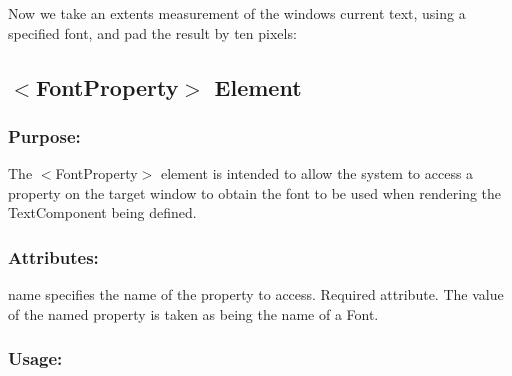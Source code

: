 Now we take an extents measurement of the windows current text, using a specified font, and pad the result by ten pixels\+: 
\begin{DoxyCode}{0}
\end{DoxyCode}
\hypertarget{fal_element_ref_fal_elem_ref_sec_13}{}\subsection{$<$\+Font\+Property$>$ Element}\label{fal_element_ref_fal_elem_ref_sec_13}
\hypertarget{fal_element_ref_fal_elem_ref_sec_13_1}{}\subsubsection{Purpose\+:}\label{fal_element_ref_fal_elem_ref_sec_13_1}
The {\ttfamily $<$Font\+Property$>$} element is intended to allow the system to access a property on the target window to obtain the font to be used when rendering the Text\+Component being defined.\hypertarget{fal_element_ref_fal_elem_ref_sec_13_2}{}\subsubsection{Attributes\+:}\label{fal_element_ref_fal_elem_ref_sec_13_2}
\begin{DoxyItemize}
\item {\ttfamily name} specifies the name of the property to access. Required attribute. The value of the named property is taken as being the name of a Font.\end{DoxyItemize}
\hypertarget{fal_element_ref_fal_elem_ref_sec_13_3}{}\subsubsection{Usage\+:}\label{fal_element_ref_fal_elem_ref_sec_13_3}


